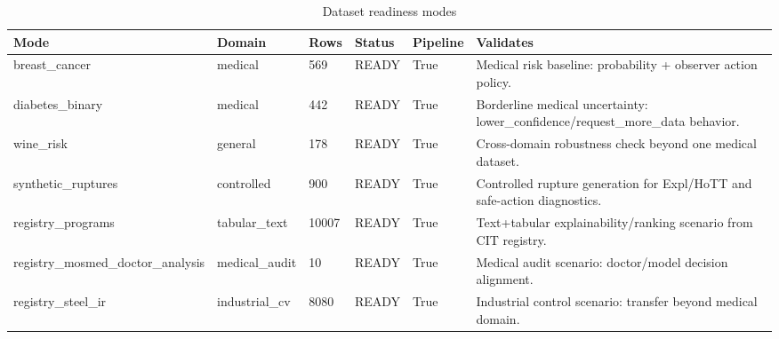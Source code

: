 \begin{table}[h]
\centering
\caption{Dataset readiness modes}
\label{tab:dataset\_readiness}
\begin{tabular}{|l|l|l|l|l|l|}
\hline
Mode & Domain & Rows & Status & Pipeline & Validates \\
\hline
breast\_cancer & medical & 569 & READY & True & Medical risk baseline: probability + observer action policy. \\
\hline
diabetes\_binary & medical & 442 & READY & True & Borderline medical uncertainty: lower\_confidence/request\_more\_data behavior. \\
\hline
wine\_risk & general & 178 & READY & True & Cross-domain robustness check beyond one medical dataset. \\
\hline
synthetic\_ruptures & controlled & 900 & READY & True & Controlled rupture generation for Expl/HoTT and safe-action diagnostics. \\
\hline
registry\_programs & tabular\_text & 10007 & READY & True & Text+tabular explainability/ranking scenario from CIT registry. \\
\hline
registry\_mosmed\_doctor\_analysis & medical\_audit & 10 & READY & True & Medical audit scenario: doctor/model decision alignment. \\
\hline
registry\_steel\_ir & industrial\_cv & 8080 & READY & True & Industrial control scenario: transfer beyond medical domain. \\
\hline
\end{tabular}
\end{table}
